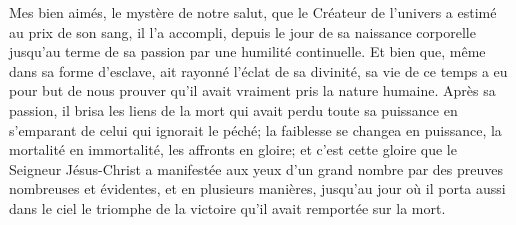 Mes bien aimés, le mystère de notre salut,
	que le Créateur de l’univers a estimé au prix de son sang,
	il l’a accompli,
	depuis le jour de sa naissance corporelle jusqu’au terme de sa passion
	par une humilité continuelle.
Et bien que, même dans sa forme d’esclave, ait rayonné l’éclat de sa divinité,
	sa vie de ce temps a eu pour but de nous prouver
		qu’il avait vraiment pris la nature humaine.
Après sa passion, il brisa les liens de la mort
	qui avait perdu toute sa puissance
		en s’emparant de celui qui ignorait le péché;
	la faiblesse se changea en puissance,
	la mortalité en immortalité,
	les affronts en gloire;
	et c’est cette gloire que le Seigneur Jésus-Christ a manifestée
	aux yeux d’un grand nombre par des preuves nombreuses et évidentes,
		et en plusieurs manières,
	jusqu’au jour où il porta aussi dans le ciel
	le triomphe de la victoire qu’il avait remportée sur la mort.
